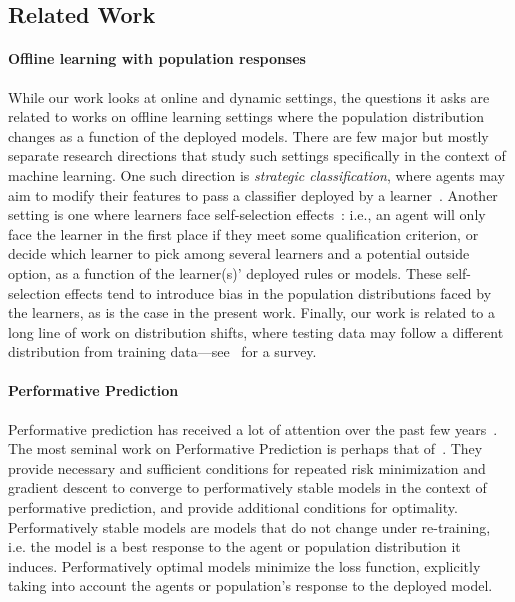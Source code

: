 \subsection{Related Work}


\paragraph{Offline learning with population responses} While our work looks at online and dynamic settings, the questions it asks are related to works on offline learning settings where the population distribution changes as a function of the deployed models. There are few major but mostly separate research directions that study such settings specifically in the context of machine learning. One such direction is \emph{strategic classification}, where agents may aim to modify their features to pass a classifier deployed by a learner~\cite{bruckner2011stackelberg, hardt2016strategic, jagadeesan2021alternative,stratindark,bechavod2022information,haghtalab2023calibrated,cohen2023sequential}. Another setting is one where learners face self-selection effects~\cite{cherapanamjeri2023makes,horowitz2024classification,gaitonde2024sample,zampetakis2022analyzing}: i.e., an agent will only face the learner in the first place if they meet some qualification criterion, or decide which learner to pick among several learners and a potential outside option, as a function of the learner(s)' deployed rules or models. These self-selection effects tend to introduce bias in the population distributions faced by the learners, as is the case in the present work. Finally, our work is related to a long line of work on distribution shifts, where testing data may follow a different distribution from training data---see~\cite{koh2021wilds} for a survey.

\paragraph{Performative Prediction} Performative prediction has received a lot of attention over the past few years~\cite{pmlr-v119-perdomo20a, NEURIPS2020_33e75ff0, pmlr-v151-brown22a,bechavod2021gaming,shavit2020causal,mendler2020stochastic,hardt2022performative,hardt2023performative}. The most seminal work on Performative Prediction is perhaps that of~\citet{pmlr-v119-perdomo20a}. They provide necessary and sufficient conditions for repeated risk minimization and gradient descent to converge to performatively stable models in the context of performative prediction, and provide additional conditions for optimality. Performatively stable models are models that do not change under re-training, i.e. the model is a best response to the agent or population distribution it induces. Performatively optimal models minimize the loss function, explicitly taking into account the agents or population's response to the deployed model.

